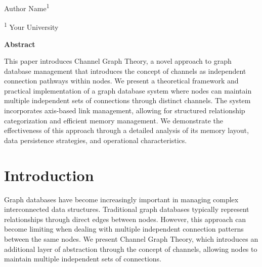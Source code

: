 \vspace{30pt}
\begin{center}
    \LARGE{}
\end{center}

\begin{center}
\vspace{4pt}
\large
    Author Name\textsuperscript{1}
    
\small
   \textsuperscript{1} Your University

\end{center}



\begin{small}
\begin{center}
\vspace{9pt}
\textbf{Abstract}    
\end{center}

\begin{adjustwidth}{20pt}{20pt}
\small \noindent 
This paper introduces Channel Graph Theory, a novel approach to graph database management that introduces the concept of channels as independent connection pathways within nodes. We present a theoretical framework and practical implementation of a graph database system where nodes can maintain multiple independent sets of connections through distinct channels. The system incorporates axis-based link management, allowing for structured relationship categorization and efficient memory management. We demonstrate the effectiveness of this approach through a detailed analysis of its memory layout, data persistence strategies, and operational characteristics.
\end{adjustwidth}


\end{small}




\vspace{10pt}
\section{Introduction}\label{Sec:Introduction}
Graph databases have become increasingly important in managing complex interconnected data structures. Traditional graph databases typically represent relationships through direct edges between nodes. However, this approach can become limiting when dealing with multiple independent connection patterns between the same nodes. We present Channel Graph Theory, which introduces an additional layer of abstraction through the concept of channels, allowing nodes to maintain multiple independent sets of connections.

